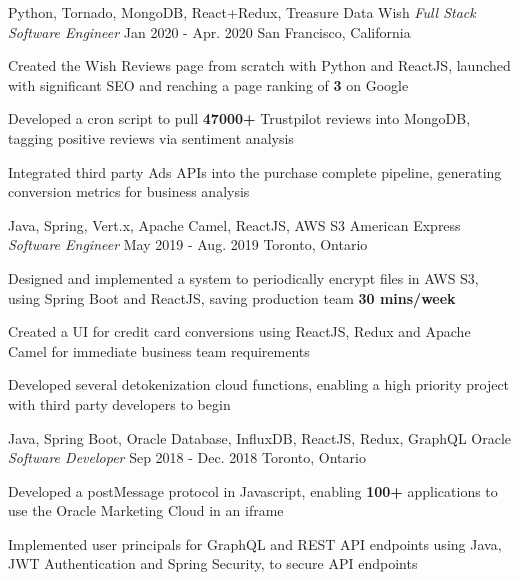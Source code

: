 \begin{siderules}
  \begin{cventries}
    \cventry
    {Python, Tornado, MongoDB, React+Redux, Treasure Data}
    {Wish \hspace{0.15em} \bodyfontlight\itshape{Full Stack Software Engineer}}
    {Jan 2020 - Apr. 2020}
    {San Francisco, California}
    {
      \begin{cvitems}
        \item {Created the Wish Reviews page from scratch with Python and ReactJS, launched with significant SEO and reaching a page ranking of \textbf{3} on Google}
        \item {Developed a cron script to pull \textbf{47000+} Trustpilot reviews into MongoDB, tagging positive reviews via sentiment analysis}
        \item {Integrated third party Ads APIs into the purchase complete pipeline, generating conversion metrics for business analysis }
      \end{cvitems}
    }
    \cventry
    {Java, Spring, Vert.x, Apache Camel, ReactJS, AWS S3}
    {American Express \hspace{0.15em} \bodyfontlight\itshape{Software Engineer}}
    {May 2019 - Aug. 2019}
    {Toronto, Ontario}
    {
      \begin{cvitems}
        \item {Designed and implemented a system to periodically encrypt files in AWS S3, using Spring Boot and ReactJS, saving production team \textbf{30 mins/week}}
        \item {Created a UI for credit card conversions using ReactJS, Redux and Apache Camel for immediate business team requirements}
        \item {Developed several detokenization cloud functions, enabling a high priority project with third party developers to begin}
      \end{cvitems}
    }
    \cventry
      {Java, Spring Boot, Oracle Database, InfluxDB, ReactJS, Redux, GraphQL}
      {Oracle \hspace{0.15em} \bodyfontlight\itshape{Software Developer}}
      {Sep 2018 - Dec. 2018}
      {Toronto, Ontario}
      {
        \begin{cvitems}
          \item {Developed a postMessage protocol in Javascript, enabling \textbf{100+} applications to use the Oracle Marketing Cloud in an iframe}
          \item {Implemented user principals for GraphQL and REST API endpoints using Java, JWT Authentication and Spring Security, to secure API endpoints}

\end{cvitems}}
\end{cventries}
\end{siderules}
